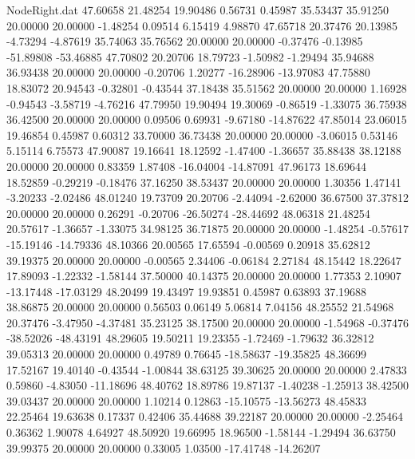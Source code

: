 \begin{filecontents}{NodeRight.dat}
  47.60658   21.48254   19.90486     0.56731    0.45987   35.53437   35.91250   20.00000   20.00000   -1.48254    0.09514    6.15419    4.98870
  47.65718   20.37476   20.13985    -4.73294   -4.87619   35.74063   35.76562   20.00000   20.00000   -0.37476   -0.13985  -51.89808  -53.46885
  47.70802   20.20706   18.79723    -1.50982   -1.29494   35.94688   36.93438   20.00000   20.00000   -0.20706    1.20277  -16.28906  -13.97083
  47.75880   18.83072   20.94543    -0.32801   -0.43544   37.18438   35.51562   20.00000   20.00000    1.16928   -0.94543   -3.58719   -4.76216
  47.79950   19.90494   19.30069    -0.86519   -1.33075   36.75938   36.42500   20.00000   20.00000    0.09506    0.69931   -9.67180  -14.87622
  47.85014   23.06015   19.46854     0.45987    0.60312   33.70000   36.73438   20.00000   20.00000   -3.06015    0.53146    5.15114    6.75573
  47.90087   19.16641   18.12592    -1.47400   -1.36657   35.88438   38.12188   20.00000   20.00000    0.83359    1.87408  -16.04004  -14.87091
  47.96173   18.69644   18.52859    -0.29219   -0.18476   37.16250   38.53437   20.00000   20.00000    1.30356    1.47141   -3.20233   -2.02486
  48.01240   19.73709   20.20706    -2.44094   -2.62000   36.67500   37.37812   20.00000   20.00000    0.26291   -0.20706  -26.50274  -28.44692
  48.06318   21.48254   20.57617    -1.36657   -1.33075   34.98125   36.71875   20.00000   20.00000   -1.48254   -0.57617  -15.19146  -14.79336
  48.10366   20.00565   17.65594    -0.00569    0.20918   35.62812   39.19375   20.00000   20.00000   -0.00565    2.34406   -0.06184    2.27184
  48.15442   18.22647   17.89093    -1.22332   -1.58144   37.50000   40.14375   20.00000   20.00000    1.77353    2.10907  -13.17448  -17.03129
  48.20499   19.43497   19.93851     0.45987    0.63893   37.19688   38.86875   20.00000   20.00000    0.56503    0.06149    5.06814    7.04156
  48.25552   21.54968   20.37476    -3.47950   -4.37481   35.23125   38.17500   20.00000   20.00000   -1.54968   -0.37476  -38.52026  -48.43191
  48.29605   19.50211   19.23355    -1.72469   -1.79632   36.32812   39.05313   20.00000   20.00000    0.49789    0.76645  -18.58637  -19.35825
  48.36699   17.52167   19.40140    -0.43544   -1.00844   38.63125   39.30625   20.00000   20.00000    2.47833    0.59860   -4.83050  -11.18696
  48.40762   18.89786   19.87137    -1.40238   -1.25913   38.42500   39.03437   20.00000   20.00000    1.10214    0.12863  -15.10575  -13.56273
  48.45833   22.25464   19.63638     0.17337    0.42406   35.44688   39.22187   20.00000   20.00000   -2.25464    0.36362    1.90078    4.64927
  48.50920   19.66995   18.96500    -1.58144   -1.29494   36.63750   39.99375   20.00000   20.00000    0.33005    1.03500  -17.41748  -14.26207

\end{filecontents}
